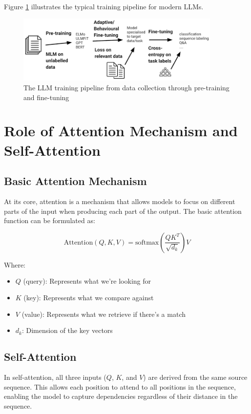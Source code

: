 \documentclass[11pt,a4paper]{report}
\begin{document}
Figure \ref{fig:pretraining-finetuning} illustrates the typical training pipeline for modern LLMs.

\begin{figure}[ht]
    \centering
    \includegraphics[width=0.9\textwidth]{pretraining_finetuning_pipeline.png}
    \caption{The LLM training pipeline from data collection through pre-training and fine-tuning}
    \label{fig:pretraining-finetuning}
\end{figure}

\section{Role of Attention Mechanism and Self-Attention}

\subsection{Basic Attention Mechanism}
At its core, attention is a mechanism that allows models to focus on different parts of the input when producing each part of the output. The basic attention function can be formulated as:

\begin{equation}
\text{Attention}(Q, K, V) = \text{softmax}\left(\frac{QK^T}{\sqrt{d_k}}\right)V
\end{equation}

Where:
\begin{itemize}
    \item $Q$ (query): Represents what we're looking for
    \item $K$ (key): Represents what we compare against
    \item $V$ (value): Represents what we retrieve if there's a match
    \item $d_k$: Dimension of the key vectors
\end{itemize}

\subsection{Self-Attention}
In self-attention, all three inputs ($Q$, $K$, and $V$) are derived from the same source sequence. This allows each position to attend to all positions in the sequence, enabling the model to capture dependencies regardless of their distance in the sequence.
\end{document}
